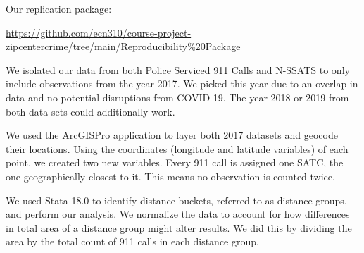 \documentclass[12pt]{article}
\begin{document}
Our replication package:

\href{https://github.com/ecn310/course-project-zipcentercrime/tree/main/Reproducibility%20Package}{https://github.com/ecn310/course-project-zipcentercrime/tree/main/Reproducibility\%20Package}

\vspace{10pt}

We isolated our data from both Police Serviced 911 Calls and N-SSATS to only include observations from the year 2017. We picked this year due to an overlap in data and no potential disruptions from COVID-19. The year 2018 or 2019 from both data sets could additionally work. 

We used the ArcGISPro application to layer both 2017 datasets and geocode their locations. Using the coordinates (longitude and latitude variables) of each point, we created two new variables. Every 911 call is assigned one SATC, the one geographically closest to it. This means no observation is counted twice. 

We used Stata 18.0 to identify distance buckets, referred to as distance groups, and perform our analysis. We normalize the data to account for how differences in total area of a distance group might alter results. We did this by dividing the area by the total count of 911 calls in each distance group. 
\end{document}
